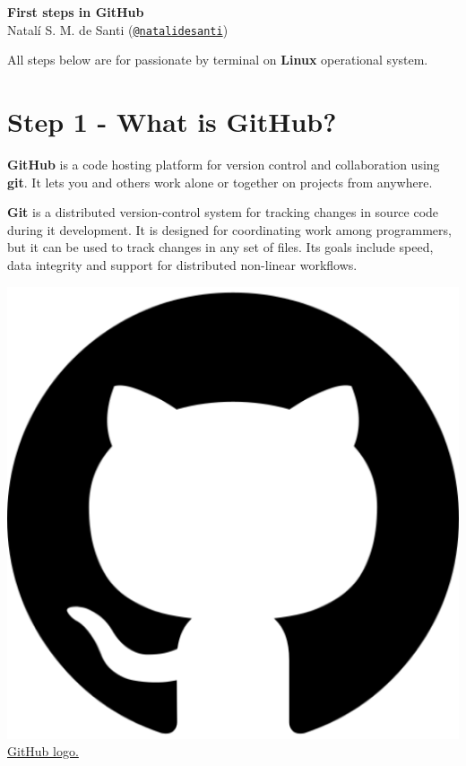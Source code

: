 \documentclass[12pt,a4paper,titlepage,brazil]{article}
\begin{document}
\begin{center}
 \huge{\textbf{First steps in GitHub}}\\
 \large{Natalí S. M. de Santi (\href{https://github.com/natalidesanti}{\texttt{@natalidesanti}})}
\end{center}

All steps below are for passionate by terminal on {\bf Linux} operational system.


\section{Step 1 - What is GitHub?}

\begin{minipage}{0.7\textwidth}
{\bf GitHub} is a code hosting platform for version control and collaboration using {\bf git}. It lets you and others work alone or together on projects from anywhere.

{\bf Git} is a distributed version-control system for tracking changes in source code during it development. It is designed for coordinating work among programmers, but it can be used to track changes in any set of files. Its goals include speed, data integrity and support for distributed non-linear workflows.\\
\end{minipage}
\begin{minipage}{0.3\textwidth}
 \vspace{-0.5cm}
 \centering    
 \includegraphics[scale=0.22]{github-logo.png}\\
\href{https://www.flaticon.com/authors/dave-gandy}{GitHub logo.}
\end{minipage}
\end{document}
